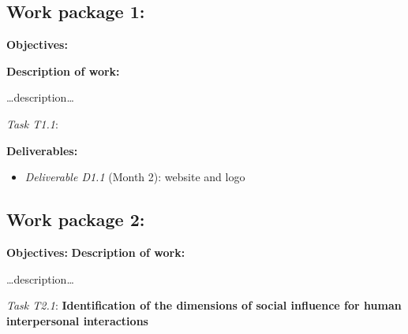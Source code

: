 \documentclass[11pt]{report}
\newcommand{\task}[2]{\vspace{0.5cm}\noindent\emph{Task T#1}: {\bf #2}\par}
\begin{document}
\subsection{Work package 1: \wpOne}



\textbf{Objectives:}

\textbf{Description of work:}

\ldots{}description\ldots{}

\task{1.1}{}

\vspace{0.5cm}\textbf{Deliverables:}

\begin{itemize}

\item   \emph{Deliverable D1.1} (Month 2): website and logo
\end{itemize}

\subsection{Work package 2: \wpTwo}

\textbf{Objectives:}
\textbf{Description of work:}

\ldots{}description\ldots{}

\task{2.1}{Identification of the dimensions of social influence for human interpersonal interactions}
\end{document}
